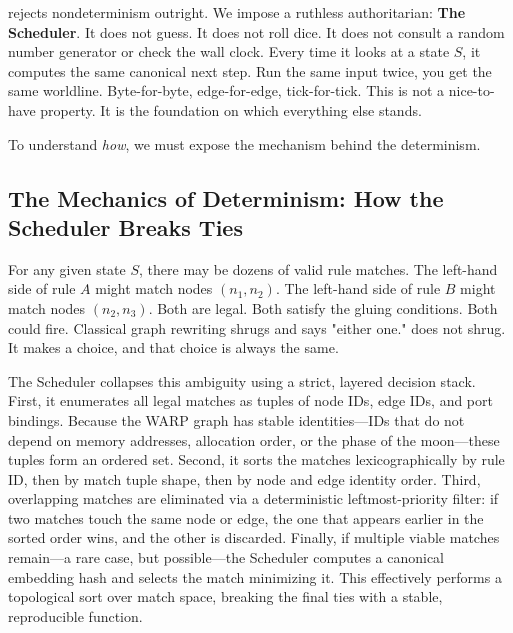 \COMPUTER{} rejects nondeterminism outright. We impose a ruthless authoritarian:
\textbf{The Scheduler}. It does not guess. It does not roll dice. It does not consult a random
number generator or check the wall clock. Every time it looks at a state $S$, it computes the same
canonical next step. Run the same input twice, you get the same worldline. Byte-for-byte,
edge-for-edge, tick-for-tick. This is not a nice-to-have property. It is the foundation on which
everything else stands.

To understand \emph{how}, we must expose the mechanism behind the determinism.

\subsection{The Mechanics of Determinism: How the Scheduler Breaks Ties}

For any given state $S$, there may be dozens of valid rule matches. The left-hand side of rule $A$
might match nodes $(n_1, n_2)$. The left-hand side of rule $B$ might match nodes $(n_2, n_3)$. Both
are legal. Both satisfy the gluing conditions. Both could fire. Classical graph rewriting shrugs and
says "either one." \COMPUTER{} does not shrug. It makes a choice, and that choice is always the
same.

The Scheduler collapses this ambiguity using a strict, layered decision stack. First, it enumerates
all legal matches as tuples of node IDs, edge IDs, and port bindings. Because the WARP graph has
stable identities—IDs that do not depend on memory addresses, allocation order, or the phase of the
moon—these tuples form an ordered set. Second, it sorts the matches lexicographically by rule ID,
then by match tuple shape, then by node and edge identity order. Third, overlapping matches are
eliminated via a deterministic leftmost-priority filter: if two matches touch the same node or edge,
the one that appears earlier in the sorted order wins, and the other is discarded. Finally, if
multiple viable matches remain—a rare case, but possible—the Scheduler computes a canonical
embedding hash and selects the match minimizing it. This effectively performs a topological sort over
match space, breaking the final ties with a stable, reproducible function.


